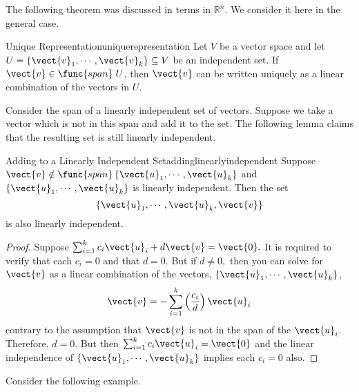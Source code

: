 The following theorem was discussed in terms in $\mathbb{R}^n$. We consider it here in the general case.

\begin{theorem}{Unique Representation}{uniquerepresentation}
Let $V$ be a vector space and let $U = \left\{ \vect{v}_1, \cdots, \vect{v}_k \right\} \subseteq V$ be an independent set. If $\vect{v} \in \func{span} \;U$, then $\vect{v}$ can be written uniquely as a linear combination of the vectors in $U$. 
\end{theorem}

Consider the span of a linearly independent set of vectors. Suppose we take a vector which is not in this span and add it to the set. The following lemma claims that the resulting set is still linearly independent. 

\begin{lemma}{Adding to a Linearly Independent Set}{addinglinearlyindependent}
Suppose $\vect{v}\notin \func{span}\left\{ \vect{u}_{1},\cdots ,\vect{u}_{k}\right\} $ and $\left\{ \vect{u}_{1},\cdots ,
\vect{u}_{k}\right\} $ is linearly independent. Then the set
\begin{equation*}
\left\{ \vect{u}_{1},\cdots ,\vect{u}_{k},\vect{v} \right\}
\end{equation*}
is also linearly independent.
\end{lemma}

\begin{proof}
Suppose $\sum_{i=1}^{k}c_{i}\vect{u}_{i}+d\vect{v}=
\vect{0}.$ It is required to verify that each $c_{i}=0$ and that $d=0.$
But if $d\neq 0,$ then you can solve for $\vect{v}$ as a linear
combination of the vectors, $\left\{ \vect{u}_{1},\cdots ,\vect{u}
_{k}\right\} $, 
\begin{equation*}
\vect{v}=-\sum_{i=1}^{k}\left( \frac{c_{i}}{d}\right) \vect{u}_{i}
\end{equation*}
contrary to the assumption that $\vect{v}$ is not in the span of the $\vect{u}_{i}$. Therefore, $d=0.$ But then $\sum_{i=1}^{k}c_{i}
\vect{u}_{i}=\vect{0}$ and the linear independence of $\left\{ \vect{u}
_{1},\cdots ,\vect{u}_{k}\right\} $ implies each $c_{i}=0$ also. 
\end{proof}

Consider the following example.

